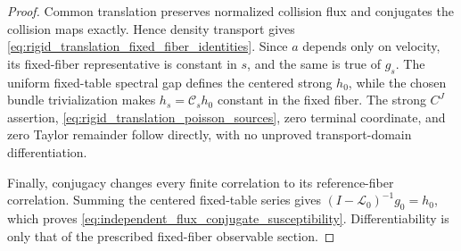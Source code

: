 \documentclass[11pt]{amsart}
\theoremstyle{compactplain}
\theoremstyle{compactdefinition}
\theoremstyle{compactremark}
\newcommand{\Ltransfer}{\mathscr L}
\begin{document}
\begin{proof}
Common translation preserves normalized collision flux and conjugates the
collision maps exactly.  Hence density transport gives
\eqref{eq:rigid_translation_fixed_fiber_identities}.  Since \(a\) depends
only on velocity, its fixed-fiber representative is constant in \(s\), and
the same is true of \(g_s\).  The uniform fixed-table spectral gap defines
the centered strong \(h_0\), while the chosen bundle trivialization makes
\(h_s=\mathcal C_sh_0\) constant in the fixed fiber.  The strong
\(C^J\) assertion, \eqref{eq:rigid_translation_poisson_sources}, zero
terminal coordinate, and zero Taylor remainder follow directly, with no
unproved transport-domain differentiation.

Finally, conjugacy changes every finite correlation to its reference-fiber
correlation.  Summing the centered fixed-table series gives
\((I-\Ltransfer_0)^{-1}g_0=h_0\), which proves
\eqref{eq:independent_flux_conjugate_susceptibility}.  Differentiability is
only that of the prescribed fixed-fiber observable section.
\end{proof}
\end{document}

